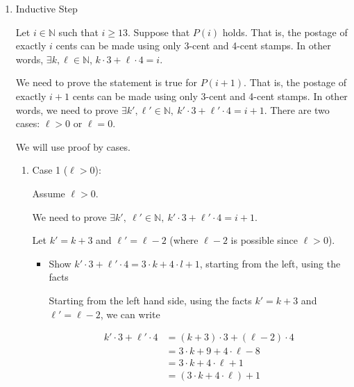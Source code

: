\documentclass[12pt]{article}
\begin{document}
\begin{itemize}
\begin{mdframed}
\begin{enumerate}[1.]
\begin{mdframed}
            \end{mdframed}

            \item Inductive Step

            \bigskip

            Let $i \in \mathbb{N}$ such that $i \geq 13$. Suppose that $P(i)$ holds. That is, the postage of
            exactly $i$ cents can be made using only 3-cent and 4-cent stamps. In other words,
            $\exists k, \ell \in \mathbb{N}$, $k \cdot 3 + \ell \cdot 4 = i$.

            \bigskip

            We need to prove the statement is true for $P(i+1)$. That is, the postage
            of exactly $i+1$ cents can be made using only 3-cent and 4-cent stamps. In other
            words, we need to prove $\exists k', \ell' \in \mathbb{N},\:
            k' \cdot 3 + \ell' \cdot 4 = i + 1$. There are two cases: $\ell > 0$
            or $\ell = 0$.

            \bigskip

            We will use proof by cases.

            \begin{enumerate}[1.]
                \item Case 1 ($\ell > 0$):

                \bigskip

                Assume $\ell > 0$.

                \bigskip

                We need to prove $\exists k',\:\ell' \in \mathbb{N},\:k' \cdot 3 + \ell' \cdot 4 = i + 1$.

                \bigskip

                Let $k' = k + 3$ and $\ell' = \ell - 2$ (where $\ell - 2$ is possible
                since $\ell > 0$).

                \begin{itemize}
                    \item Show $k' \cdot 3 + \ell' \cdot 4 = 3 \cdot k + 4 \cdot l + 1$, starting from the left, using the facts

                    \begin{mdframed}
                    Starting from the left hand side, using the facts $k' = k + 3$ and $\ell' = \ell - 2$, we can write

                    \setcounter{equation}{0}
                    \begin{align}
                        k' \cdot 3 + \ell' \cdot 4 &= (k+3) \cdot 3 + (\ell-2) \cdot 4\\
                        &= 3 \cdot k + 9 + 4 \cdot \ell - 8\\
                        &= 3 \cdot k + 4 \cdot \ell + 1\\
                        &= (3 \cdot k + 4 \cdot \ell) + 1
                    \end{align}


\end{mdframed}
\end{itemize}
\end{enumerate}
\end{enumerate}
\end{mdframed}
\end{itemize}
\end{document}

